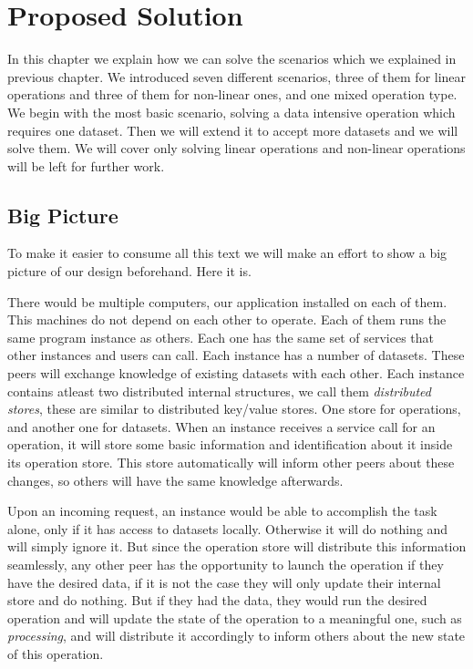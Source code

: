 \chapter{Proposed Solution}
\label{cha:proposal}
In this chapter we explain how we can solve the scenarios which we explained in previous chapter.
We introduced seven different scenarios, three of them for linear operations and three of them for non-linear
ones, and one mixed operation type. We begin with the most basic scenario, solving a data intensive operation
which requires one dataset. Then we will extend it to accept more datasets and we will solve them. We will
cover only solving linear operations and non-linear operations will be left for further work.

\section{Big Picture}
To make it easier to consume all this text we will make an effort to show a big picture of our design beforehand. Here it is.

There would be multiple computers, our application installed on each of them. This machines do not depend on each
other to operate. Each of them runs the same program instance as others. Each one has the same set of services that
other instances and users can call. Each instance has a number of datasets. These peers will exchange knowledge of
existing datasets with each other. Each instance contains atleast two distributed internal structures,
we call them \textit{distributed stores}, these are similar to distributed key/value stores.
One store for operations, and another one for datasets. When an instance receives a service call for an operation, it
will store some basic information and identification about it inside its operation store. This store automatically will
inform other peers about these changes, so others will have the same knowledge afterwards.

Upon an incoming request, an instance would be able to accomplish the task alone, only if it has access to datasets locally.
Otherwise it will do nothing and will simply ignore it. But since the operation store will distribute this information
seamlessly, any other peer has the opportunity to launch the operation if they have the desired data, if it is not the case
they will only update their internal store and do nothing. But if they had the data, they would run the desired operation
and will update the state of the operation to a meaningful one, such as \textit{processing}, and will distribute it
accordingly to inform others about the new state of this operation.

